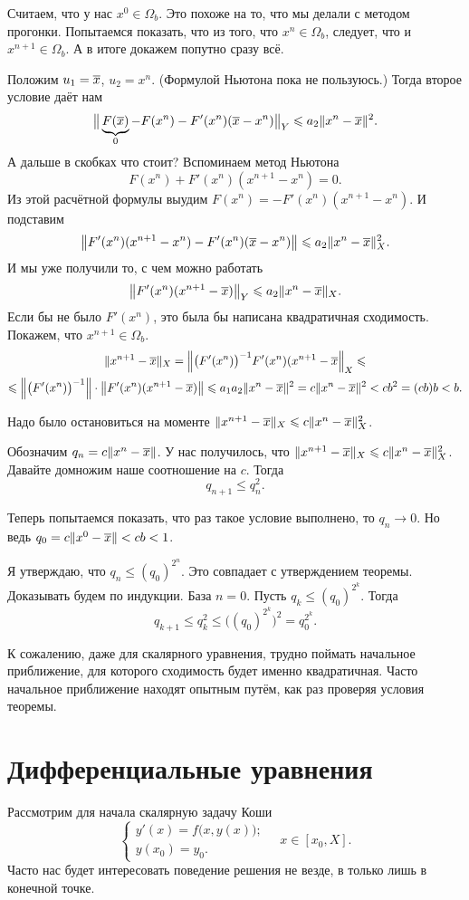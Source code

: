\begin{Proof}
 Считаем, что у нас $x^0\in\Omega_b$. Это похоже на то, что мы делали с методом прогонки. Попытаемся показать, что из того, что $x^n\in \Omega_b$, следует, что и $x^{n+1}\in \Omega_b$. А в итоге докажем попутно сразу всё.

Положим $u_1 = \overline{x}$, $u_2 = x^n$. (Формулой Ньютона пока не пользуюсь.) Тогда второе условие даёт нам
\[
  \big\|\underbrace{F(\overline{x})}_0 - F(x^n) - F'(x^n)(\overline{x} - x^n)\big\|_Y\leqslant a_2\|x^n-\overline{x}\|^2.
\]
А дальше в скобках что стоит? Вспоминаем метод Ньютона
\[
  F(x^n) + F'(x^n)(x^{n+1} - x^n) = 0.
\]
Из этой расчётной формулы выудим $F(x^n) = -F'(x^n)(x^{n+1} - x^n)$.  И подставим
\[
  \big\|F'(x^n) (x^{n+1} - x^n) - F'(x^n)(\overline{x} - x^n)\big\|\leqslant a_2\|x^n - \overline{x}\|^2_X.
\]
И мы уже получили то, с чем можно работать
\[
  \big\|F'(x^n)(x^{n+1} - \overline{x})\big\|_Y\leqslant a_2 \|x^n - \overline{x}\|_X.
\]
Если бы не было $F'(x^n)$, это была бы написана квадратичная сходимость. Покажем, что $x^{n+1}\in\Omega_b$.
\begin{multline*}
  \|x^{n+1} - \overline{x}\|_X = \Big\|\big(F'(x^n)\big)^{-1} F'(x^n)(x^{n+1} - \overline{x}\Big\|_X\leqslant \\\leqslant
  \Big\|\big(F'(x^n)\big)^{-1}\Big\| \cdot \big\|F'(x^n)(x^{n+1}-\overline{x})\big\|\leqslant a_1a_2 \|x^n-\overline{x}\|^2 = c\|x^n - \overline{x}\|^2 < cb^2 = (cb) b< b.
\end{multline*}

Надо было остановиться на моменте $\|x^{n+1} - \overline{x}\|_X \leqslant c\|x^n - \overline{x}\|^2_X$.

Обозначим $q_n = c\|x^n - \overline{x}\|$. У нас получилось, что $\|x^{n+1} - \overline{x}\|_X \leqslant c\|x^n - \overline{x}\|^2_X$. Давайте домножим наше соотношение на $c$. Тогда
\[
  q_{n+1} \le q_n^2.
\]

Теперь попытаемся показать, что раз такое условие выполнено, то $q_n\to 0$. Но ведь $q_0 = c\|x^0 - \overline{x}\|<cb <1$.

Я утверждаю, что $q_n \le (q_0)^{2^n}$. Это совпадает с утверждением теоремы. Доказывать будем по индукции. База $n=0$. Пусть $q_k\le (q_0)^{2^k}$. Тогда
\[
  q_{k+1}\le q_k^2 \le \big((q_0)^{2^k}\big)^2 = q_0^{2^k}.
\]
\end{Proof}

К сожалению, даже для скалярного уравнения, трудно поймать начальное приближение, для которого сходимость будет именно квадратичная. Часто начальное приближение находят опытным путём, как раз проверяя условия теоремы.

\section{Дифференциальные уравнения}
Рассмотрим для начала скалярную задачу Коши
\[
  \begin{cases}
  y'(x) = f\big(x,y(x)\big);\\
  y(x_0) = y_0.
\end{cases}
\quad
 x\in[x_0,X].
\]
Часто нас будет интересовать поведение решения не везде, в только лишь в конечной точке.

